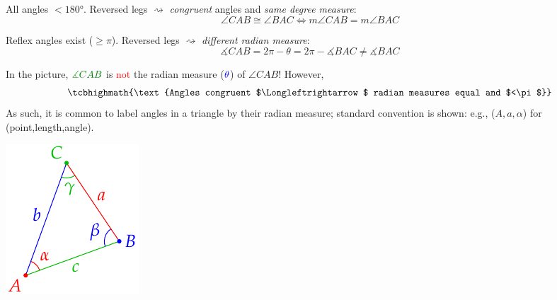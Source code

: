 \begin{description}\itemsep0pt
  \item[Euclidean geometry] All angles $<\ang{180}$. Reversed legs $\rightsquigarrow$ \emph{congruent} angles and \emph{same degree measure}:
  \[
  	\angle CAB\cong\angle BAC\iff m\angle CAB=m\angle BAC
  \]
  \item[Analytic geometry] Reflex angles exist ($\ge\pi$). Reversed legs $\rightsquigarrow$ \emph{different radian measure}:
  \[
  	\measuredangle CAB=2\pi-\theta=2\pi-\measuredangle BAC \neq \measuredangle BAC \tag{unless a straight edge}
  \]
	\begin{minipage}[t]{0.79\linewidth}\vspace{-5pt}
  	In the picture, $\textcolor{Green}{\measuredangle CAB}$ is \textcolor{red}{not} the radian measure ($	\textcolor{blue}{\theta}$) of $\angle CAB$! However,
  	\[
			\tcbhighmath{\text{Angles congruent $\Longleftrightarrow$ radian measures equal and $<\pi$}}
		\]
		As such, it is common to label angles in a triangle by their radian measure; standard convention is shown: e.g., ($A,a,\alpha$) for (point,length,angle).%
	\end{minipage}
	\hfill
	\begin{minipage}[t]{0.2\linewidth}\vspace{-17pt}
		\flushright\includegraphics{angle-notation}
	\end{minipage}
\end{description}




